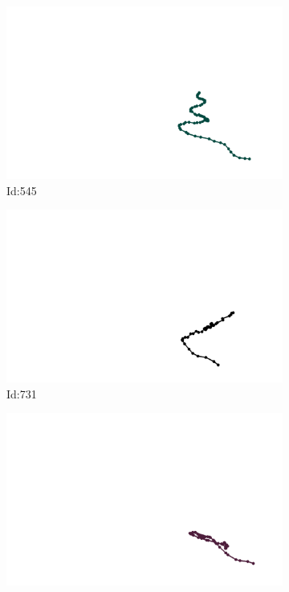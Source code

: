 \documentclass[12pt,twoside]{report}
\begin{document}
\begin{figure}
\centering
\begin{subfigure}[b]{0.20\textwidth}
\centering
\includegraphics[width=\textwidth]{../../trajectories/545.png}
\caption{Id:545}
\end{subfigure}
\begin{subfigure}[b]{0.20\textwidth}
\centering
\includegraphics[width=\textwidth]{../../trajectories/731.png}
\caption{Id:731}
\end{subfigure}
\begin{subfigure}[b]{0.20\textwidth}
\centering
\includegraphics[width=\textwidth]{../../trajectories/760.png}

\end{subfigure}
\end{figure}
\end{document}

